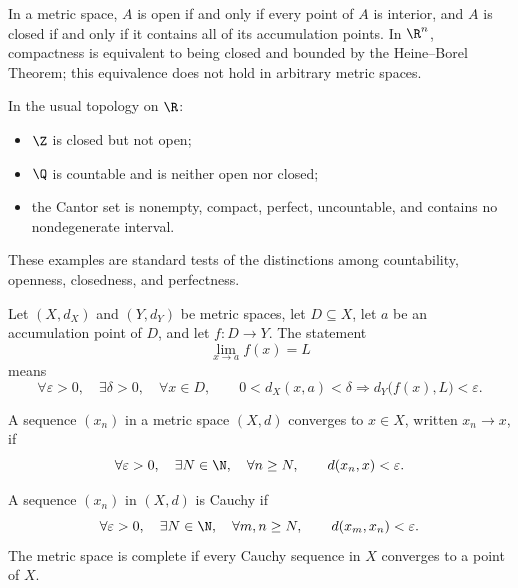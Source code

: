 \begin{definition}
        In a metric space, $A$ is open if and only if every point of $A$ is
        interior, and $A$ is closed if and only if it contains all of its
        accumulation points. In $\R^n$,
        compactness is equivalent to being closed and bounded by the
        Heine--Borel Theorem; this equivalence does not hold in arbitrary metric
        spaces.
    \end{definition}

    \begin{fact}
        In the usual topology on $\R$:
        \begin{itemize}
            \item $\Z$ is closed but not open;
            \item $\Q$ is countable and is neither open nor closed;
            \item the Cantor set is nonempty, compact, perfect, uncountable, and
                  contains no nondegenerate interval.
        \end{itemize}
        These examples are standard tests of the distinctions among countability,
        openness, closedness, and perfectness.
    \end{fact}

    \begin{definition}
        Let $(X,d_X)$ and $(Y,d_Y)$ be metric spaces, let $D\subseteq X$, let
        $a$ be an accumulation point of $D$, and let $f\colon D\to Y$. The statement
        \[
            \lim\limits_{x\to a}f(x)=L
        \]
        means
        \[
            \forall\varepsilon>0,
            \quad
            \exists\delta>0,
            \quad
            \forall x\in D,
            \qquad
            0<d_X(x,a)<\delta
            \Rightarrow
            d_Y\bigl(f(x),L\bigr)<\varepsilon.
        \]
    \end{definition}

    \begin{definition}
        A sequence $(x_n)$ in a metric space $(X,d)$ converges to $x\in X$,
        written $x_n\to x$, if
        \[
            \forall\varepsilon>0,
            \quad
            \exists N\in\N,
            \quad
            \forall n\geq N,
            \qquad
            d(x_n,x)<\varepsilon.
        \]
    \end{definition}

    \begin{definition}
        A sequence $(x_n)$ in $(X,d)$ is Cauchy if
        \[
            \forall\varepsilon>0,
            \quad
            \exists N\in\N,
            \quad
            \forall m,n\geq N,
            \qquad
            d(x_m,x_n)<\varepsilon.
        \]
        The metric space is complete if every Cauchy sequence in $X$ converges
        to a point of $X$.
    \end{definition}

